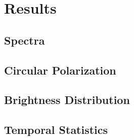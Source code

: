 \section{Results}

\subsection{Spectra}


\subsection{Circular Polarization}


\subsection{Brightness Distribution}


\subsection{Temporal Statistics}